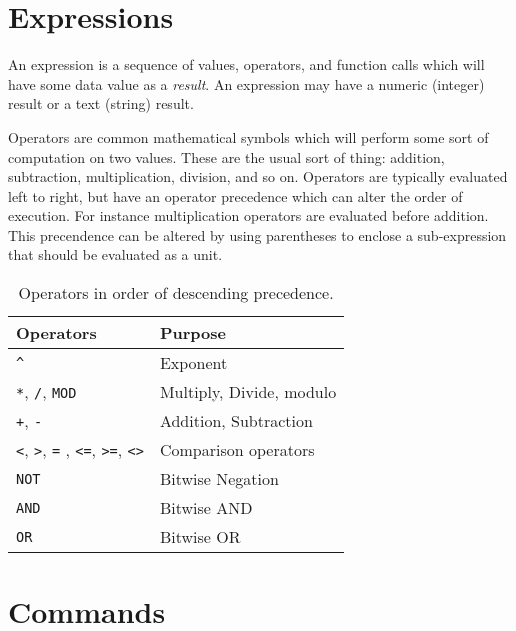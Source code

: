 \documentclass{report}
\begin{document}
    \section*{Expressions}

    An expression is a sequence of values, operators, and function calls which will have some data value as a {\em result}.
    An expression may have a numeric (integer) result or a text (string) result.

    Operators are common mathematical symbols which will perform some sort of computation on two values. These are the usual
    sort of thing: addition, subtraction, multiplication, division, and so on. Operators are typically evaluated left to right,
    but have an operator precedence which can alter the order of execution. For instance multiplication operators are evaluated
    before addition. This precendence can be altered by using parentheses to enclose a sub-expression that should be evaluated
    as a unit.

    \begin{table}[!htb]
        \begin{center}
            \begin{tabular}{|l|l|} \hline
                Operators & Purpose \\ \hline\hline
                \verb+^+ & Exponent \\ \hline
                \verb+*+, \verb+/+, \verb+MOD+ & Multiply, Divide, modulo \\ \hline
                \verb-+-, \verb+-+ & Addition, Subtraction \\ \hline
                \verb+<+, \verb+>+, \verb+=+ , \verb+<=+, \verb+>=+, \verb+<>+ & Comparison operators \\ \hline
                \verb+NOT+ & Bitwise Negation \\ \hline
                \verb+AND+ & Bitwise AND \\ \hline
                \verb+OR+ & Bitwise OR \\ \hline
            \end{tabular}
            \caption{Operators in order of descending precedence.}
        \end{center}
    \end{table}

    \section*{Commands}
\end{document}
